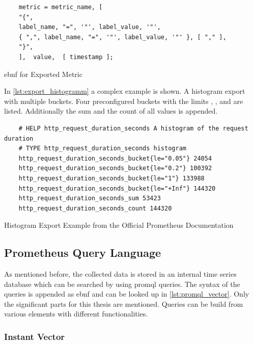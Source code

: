 \begin{listing}[!ht]
	\begin{verbatim}
	metric = metric_name, [ 
	"{",
	label_name, "=", '"', label_value, '"',
	{ ",", label_name, "=", '"', label_value, '"' }, [ "," ], 
	"}",
	],  value,  [ timestamp ];
	\end{verbatim}
	\caption{\gls{ebnf} for Exported Metric}
	\label{lst:ebnf_metric_export}
\end{listing}

In \cref{lst:export_histogramm} a complex example is shown. A histogram export with multiple buckets. Four preconfigured buckets with the limits , ,  and  are listed. Additionally the sum and the count of all values is appended. 

\begin{listing}[!ht]
	\begin{verbatim}
	# HELP http_request_duration_seconds A histogram of the request duration
	# TYPE http_request_duration_seconds histogram
	http_request_duration_seconds_bucket{le="0.05"} 24054
	http_request_duration_seconds_bucket{le="0.2"} 100392
	http_request_duration_seconds_bucket{le="1"} 133988
	http_request_duration_seconds_bucket{le="+Inf"} 144320
	http_request_duration_seconds_sum 53423
	http_request_duration_seconds_count 144320
	\end{verbatim}
	\caption[Histogram Export Example from the Official Prometheus Documentation]{Histogram Export Example from the Official Prometheus Documentation~\cite{PrometheusExpositionFormatBeispiel}}
	\label{lst:export_histogramm}
\end{listing}

\subsection{Prometheus Query Language}
\label{subsec:promql}

As mentioned before, the collected data is stored in an internal time series database which can be searched by using \gls{promql} queries.
The syntax of the queries is appended as \gls{ebnf} and can be looked up in \cref{lst:promql_vector}. Only the significant parts for this thesis are mentioned.
Queries can be build from various elements with different functionalities.

\subsubsection{Instant Vector}

